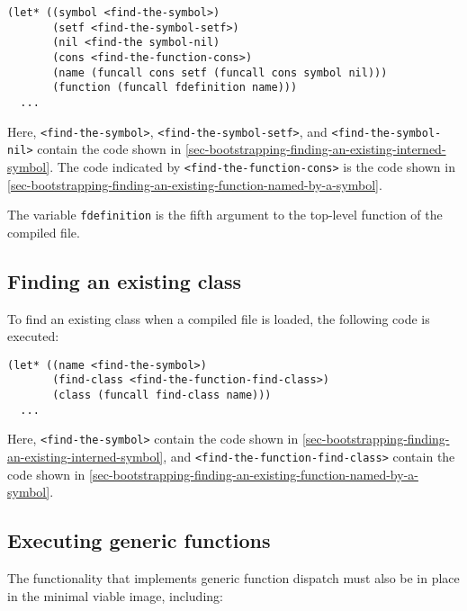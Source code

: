 \begin{verbatim}
(let* ((symbol <find-the-symbol>)
       (setf <find-the-symbol-setf>)
       (nil <find-the symbol-nil)
       (cons <find-the-function-cons>)
       (name (funcall cons setf (funcall cons symbol nil)))
       (function (funcall fdefinition name)))
  ...
\end{verbatim}

Here, \texttt{<find-the-symbol>}, \texttt{<find-the-symbol-setf>}, and
\texttt{<find-the-symbol-nil>} contain the code shown in
\ref{sec-bootstrapping-finding-an-existing-interned-symbol}.  The code
indicated by \texttt{<find-the-function-cons>} is the code shown in
\ref{sec-bootstrapping-finding-an-existing-function-named-by-a-symbol}.

The variable \texttt{fdefinition} is the fifth argument to the
top-level function of the compiled file.

\subsection{Finding an existing class}
\label{sec-bootstrapping-finding-an-existing-class}

To find an existing class when a compiled file is loaded, the
following code is executed:

\begin{verbatim}
(let* ((name <find-the-symbol>)
       (find-class <find-the-function-find-class>)
       (class (funcall find-class name)))
  ...
\end{verbatim}

Here, \texttt{<find-the-symbol>} contain the code shown in
\ref{sec-bootstrapping-finding-an-existing-interned-symbol}, and
\texttt{<find-the-function-find-class>} contain the code shown in
\ref{sec-bootstrapping-finding-an-existing-function-named-by-a-symbol}.

\subsection{Executing generic functions}
\label{sec-bootstrapping-executing-generic-functions}

The functionality that implements generic function dispatch must also
be in place in the minimal viable image, including:

